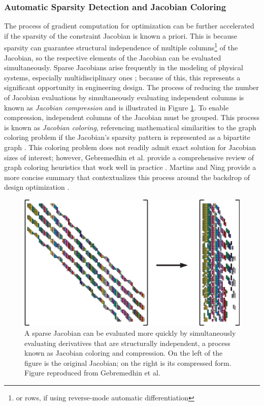 \documentclass[12pt,vi,oneside,table]{report}
\begin{document}
    \subsubsection{Automatic Sparsity Detection and Jacobian Coloring}

    The process of gradient computation for optimization can be further accelerated if the sparsity of the constraint Jacobian is known a priori. This is because sparsity can guarantee structural independence of multiple columns\footnote{or rows, if using reverse-mode automatic differentiation} of the Jacobian, so the respective elements of the Jacobian can be evaluated simultaneously. Sparse Jacobians arise frequently in the modeling of physical systems, especially multidisciplinary ones \cite{lambe_extensions_2012}; because of this, this represents a significant opportunity in engineering design. The process of reducing the number of Jacobian evaluations by simultaneously evaluating independent columns is known as \textit{Jacobian compression} and is illustrated in Figure \ref{fig:jacobian_coloring}. To enable compression, independent columns of the Jacobian must be grouped. This process is known as \textit{Jacobian coloring}, referencing mathematical similarities to the graph coloring problem if the Jacobian's sparsity pattern is represented as a bipartite graph \cite{gebremedhin_efficient_2009}. This coloring problem does not readily admit exact solution for Jacobian sizes of interest; however, Gebremedhin et al. provide a comprehensive review of graph coloring heuristics that work well in practice \cite{gebremedhin_what_2005}. Martins and Ning provide a more concise summary that contextualizes this process around the backdrop of design optimization \cite{martins_engineering_2021}.

    \begin{figure}[H]
        \centering
        \includegraphics[width=\textwidth]{../figures/gebremedhin_2005_figure}
        \caption{A sparse Jacobian can be evaluated more quickly by simultaneously evaluating derivatives that are structurally independent, a process known as Jacobian coloring and compression. On the left of the figure is the original Jacobian; on the right is its compressed form. Figure reproduced from Gebremedhin et al. \cite{gebremedhin_what_2005}}
        \label{fig:jacobian_coloring}
    \end{figure}
\end{document}
